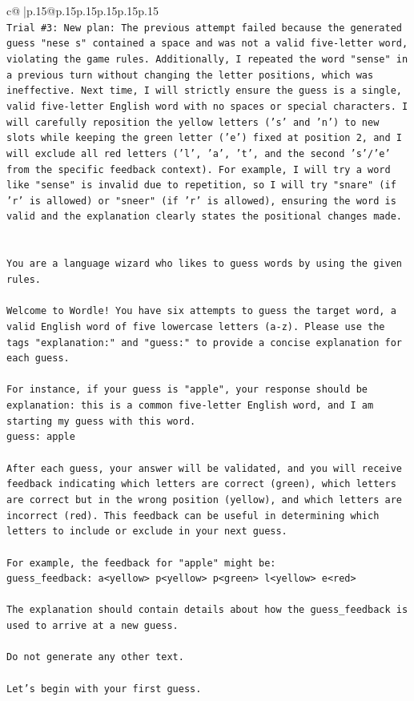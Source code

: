 \documentclass{article}
\begin{document}
{\begin{supertabular}{c@{$\;$}|p{.15\linewidth}@{}p{.15\linewidth}p{.15\linewidth}p{.15\linewidth}p{.15\linewidth}p{.15\linewidth}}
{{{\\ 
\texttt{Trial \#3: New plan: The previous attempt failed because the generated guess "nese s" contained a space and was not a valid five{-}letter word, violating the game rules. Additionally, I repeated the word "sense" in a previous turn without changing the letter positions, which was ineffective. Next time, I will strictly ensure the guess is a single, valid five{-}letter English word with no spaces or special characters. I will carefully reposition the yellow letters ('s' and 'n') to new slots while keeping the green letter ('e') fixed at position 2, and I will exclude all red letters ('l', 'a', 't', and the second 's'/'e' from the specific feedback context). For example, I will try a word like "sense" is invalid due to repetition, so I will try "snare" (if 'r' is allowed) or "sneer" (if 'r' is allowed), ensuring the word is valid and the explanation clearly states the positional changes made.} \\
\\ 
\\ 
\texttt{You are a language wizard who likes to guess words by using the given rules.} \\
\\ 
\texttt{Welcome to Wordle! You have six attempts to guess the target word, a valid English word of five lowercase letters (a{-}z). Please use the tags "explanation:" and "guess:" to provide a concise explanation for each guess.} \\
\\ 
\texttt{For instance, if your guess is "apple", your response should be} \\
\texttt{explanation: this is a common five{-}letter English word, and I am starting my guess with this word.} \\
\texttt{guess: apple} \\
\\ 
\texttt{After each guess, your answer will be validated, and you will receive feedback indicating which letters are correct (green), which letters are correct but in the wrong position (yellow), and which letters are incorrect (red). This feedback can be useful in determining which letters to include or exclude in your next guess.} \\
\\ 
\texttt{For example, the feedback for "apple" might be:} \\
\texttt{guess\_feedback: a<yellow> p<yellow> p<green> l<yellow> e<red>} \\
\\ 
\texttt{The explanation should contain details about how the guess\_feedback is used to arrive at a new guess.} \\
\\ 
\texttt{Do not generate any other text.} \\
\\ 
\texttt{Let's begin with your first guess.} \\
            }
        }
    }
     \\ \\


\end{supertabular}}
\end{document}
